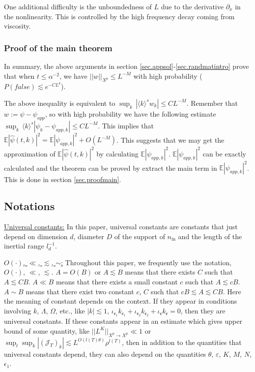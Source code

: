 One additional difficulty is the unboundedness of $L$ due to the derivative $\partial_x$ in the nonlinearity. This is controlled by the high frequency decay coming from viscosity.

\subsubsection{Proof of the main theorem} In summary, the above arguments in section \ref{sec.appsol}-\ref{sec.randmatintro} prove that when $t\le \alpha^{-2}$, we have $||w||_{X^p}\le L^{-M}$ with high probability ($P(\textit{false})\lesssim e^{-CL^{\theta}}$).   


The above inequality is equivalent to $\sup_k\, |\langle k \rangle^s w_k|\le CL^{-M}$. Remember that $w:=\psi-\psi_{app}$, so with high probability we have the following estimate $\sup_k\, \langle k \rangle^s |\psi_k-\psi_{app,k}|\le CL^{-M}$. This implies that $\mathbb E |\widehat \psi(t, k)|^2=\mathbb E |\psi_{app,k}|^2+O(L^{-M})$. This suggests that we may get the approximation of $\mathbb E |\widehat \psi(t, k)|^2$ by calculating $\mathbb E |\psi_{app,k}|^2$. $\mathbb E |\psi_{app,k}|^2$ can be exactly calculated and the theorem can be proved by extract the main term in $\mathbb E |\psi_{app,k}|^2$. This is done in section \ref{sec.proofmain}.

 
\subsection{Notations}\label{sec.notat} 

\underline{Universal constants:} In this paper, universal constants are constants that just depend on dimension $d$, diameter $D$ of the support of $n_{\text{in}}$ and the length of the inertial range $l^{-1}_d$. 

\underline{$O(\cdot)$, $\ll$, $\lesssim$, $\sim$:} Throughout this paper, we frequently use the notation, $O(\cdot)$, $\ll$, $\lesssim$. $A=O(B)$ or $A\lesssim B$ means that there exists $C$ such that $A\lesssim CB$. $A\ll B$ means that there exists a small constant $c$ such that $A\lesssim cB$. $A\sim B$ means that there exist two constant $c$, $C$ such that $cB\lesssim A\lesssim CB$. Here the meaning of constant depends on the context. If they appear in conditions involving $k$, $\Lambda$, $\Omega$, etc., like $|k|\lesssim 1$, $\iota_{\mathfrak{e}_1}k_{\mathfrak{e}_1}+\iota_{\mathfrak{e}_2}k_{\mathfrak{e}_2}+\iota_{\mathfrak{e}}k_{\mathfrak{e}}=0$, then they are universal constants. If these constants appear in an estimate which gives upper bound of some quantity, like $||L^K||_{X^p\rightarrow X^p}\ll 1$ or $\sup_t\sup_k  |(\mathcal{J}_T)_k|\lesssim L^{O(l(T)\theta)} \rho^{l(T)}$, then in addition to the quantities that universal constants depend, they can also depend on the quantities $\theta$, $\varepsilon$, $K$, $M$, $N$, $\epsilon_1$.


